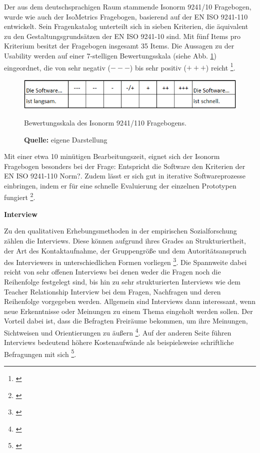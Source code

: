 Der aus dem deutschsprachigen Raum stammende Isonorm 9241/10 Fragebogen, wurde wie auch der IsoMetrics Fragebogen, basierend auf der EN ISO 9241-110 entwickelt. Sein Fragenkatalog unterteilt sich in sieben Kriterien, die äquivalent zu den Gestaltungsgrundsätzen der EN ISO 9241-10 sind. Mit fünf Items pro Kriterium besitzt der Fragebogen insgesamt 35 Items. Die Aussagen zu der Usability werden auf einer 7-stelligen Bewertungsskala (siehe Abb. \ref{fig:IsonormBewertungsskala}) eingeordnet, die von sehr negativ (\glqq $---$\grqq{}) bis sehr positiv (\glqq $+++$\grqq{}) reicht \footnote{\cite[vgl.][Kap. 3.3]{Figl2010}}. 
\begin{figure}[H]
  \centering
  \includegraphics[scale=0.95]{img/Isonorm_Bewertungsskala.PNG}
  \caption{Bewertungsskala des Isonorm 9241/110 Fragebogens.}
  \caption*{\textbf{Quelle:} eigene Darstellung}
  \label{fig:IsonormBewertungsskala}
\end{figure}
Mit einer etwa 10 minütigen Bearbeitungszeit, eignet sich der Isonorm Fragebogen besonders bei der Frage: \glqq Entspricht die Software den Kriterien der EN ISO 9241-110 Norm?\grqq{}. Zudem lässt er sich gut in iterative Softwareprozesse einbringen, indem er für eine schnelle Evaluierung der einzelnen Prototypen fungiert \footnote{\cite[vgl.][Kap. 3.3]{Figl2010}}.

\textbf{Interview}

Zu den qualitativen Erhebungsmethoden in der empirischen Sozialforschung zählen die Interviews. Diese können aufgrund ihres Grades an Strukturiertheit, der Art des Kontaktaufnahme, der Gruppengröße und dem Autoritätsanspruch des Interviewers in unterschiedlichen Formen vorliegen \footnote{\cite[vgl.][61]{Hegner2003}}. Die Spannweite dabei reicht von sehr offenen Interviews bei denen weder die Fragen noch die Reihenfolge festgelegt sind, bis hin zu sehr strukturierten Interviews wie dem \glqq Teacher Relationship Interview\grqq{} bei dem Fragen, Nachfragen und deren Reihenfolge vorgegeben werden. Allgemein sind Interviews dann interessant, wenn neue Erkenntnisse oder Meinungen zu einem Thema eingeholt werden sollen. Der Vorteil dabei ist, dass die Befragten Freiräume bekommen, um ihre Meinungen, Sichtweisen und Orientierungen zu äußern \footnote{\cite[vgl.][52\psqq]{Kelle2008}}. Auf der anderen Seite führen Interviews bedeutend höhere Kostenaufwände als beispielsweise schriftliche Befragungen mit sich \footnote{\cite[vgl.][62\psq]{Hegner2003}}.

